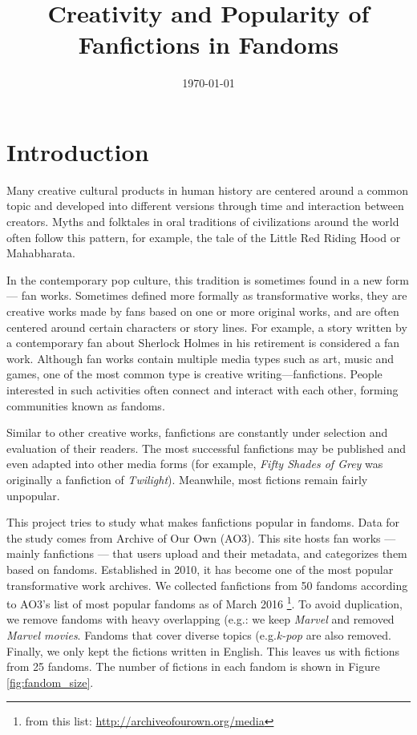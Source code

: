 \documentclass[11pt]{article} %
\begin{document}

\title{Creativity and Popularity of Fanfictions in Fandoms} %
\date{\today}
\maketitle %

\section{Introduction} %
\label{sec:introduction}
Many creative cultural products in human history are centered around a common topic and developed into different versions through time and interaction between creators. Myths and folktales in oral traditions of civilizations around the world often follow this pattern, for example, the tale of the Little Red Riding Hood or Mahabharata. 

In the contemporary pop culture, this tradition is sometimes found in a new form --- fan works. Sometimes defined more formally as transformative works, they are creative works made by fans based on one or more original works, and are often centered around certain characters or story lines\cite{wiki:transf_work}. For example, a story written by a contemporary fan about Sherlock Holmes in his retirement is considered a fan work. Although fan works contain multiple media types such as art, music and games, one of the most common type is creative writing---fanfictions. People interested in such activities often 
connect and interact with each other, forming communities known as fandoms\cite{wiki:fandom}.

Similar to other creative works, fanfictions are constantly under selection and evaluation of their readers. The most successful fanfictions may be published and even adapted into other media forms (for example, \emph{Fifty Shades of Grey} was originally a fanfiction of \emph{Twilight}). Meanwhile, most fictions remain fairly unpopular.

This project tries to study what makes fanfictions popular in fandoms. Data for the study comes from Archive of Our Own (AO3). This site hosts fan works --- mainly fanfictions --- that users upload and their metadata, and categorizes them based on fandoms. Established in 2010, it has become one of the most popular transformative work archives. We collected fanfictions from 50 fandoms according to AO3's list of most popular fandoms as of March 2016 \footnote{from this list: \url{http://archiveofourown.org/media}}. To avoid duplication, we remove fandoms with heavy overlapping (e.g.: we keep \emph{Marvel} and removed \emph{Marvel movies}. Fandoms that cover diverse topics (e.g.\emph{k-pop} are also removed. Finally, we only kept the fictions written in English. This leaves us with  fictions from 25 fandoms. The number of fictions in each fandom is shown in Figure \ref{fig:fandom_size}.
\end{document}

